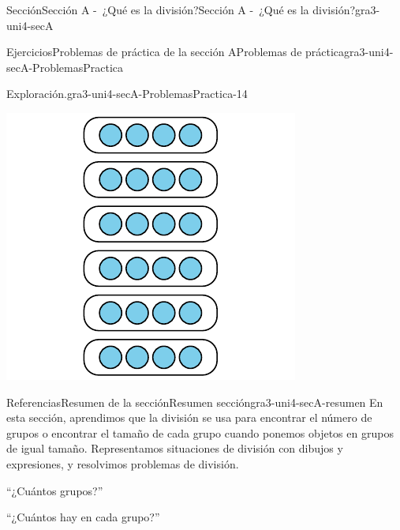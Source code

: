 \documentclass[twoside,10pt,]{article}
\begin{document}
\begin{sectionptx}{Sección}{Sección A -~¿Qué es la división?}{}{Sección A -~¿Qué es la división?}{}{}{gra3-uni4-secA}
\begin{exercises-subsection}{Ejercicios}{Problemas de práctica de la sección A}{}{Problemas de práctica}{}{}{gra3-uni4-secA-ProblemasPractica}
\begin{divisionexercise}{12}{Exploración.}{}{gra3-uni4-secA-ProblemasPractica-14}
\begin{sidebyside}{3}{0}{0}{0.02}
\begin{sbspanel}{0.32}
\includegraphics[width=\linewidth]{external/svg-source/tikz-file-151676.pdf}
\end{sbspanel}%
\end{sidebyside}%
\end{divisionexercise}%
\end{exercises-subsection}
%
%
\typeout{************************************************}
\typeout{************************************************}
%
\begin{references-subsection}{Referencias}{Resumen de la sección}{}{Resumen sección}{}{}{gra3-uni4-secA-resumen}
En esta sección, aprendimos que la división se usa para encontrar el número de grupos o encontrar el tamaño de cada grupo cuando ponemos objetos en grupos de igual tamaño. Representamos situaciones de división con dibujos y expresiones, y resolvimos problemas de división.%
\begin{sidebyside}{2}{0.025}{0.025}{0.05}%
\begin{sbspanel}{0.45}%
``¿Cuántos grupos?''%
\end{sbspanel}%
\begin{sbspanel}{0.45}%
\par
``¿Cuántos hay en cada grupo?''%
\end{sbspanel}%
\end{sidebyside}%
\begin{sidebyside}{2}{0.025}{0.025}{0.05}%

\end{sidebyside}
\end{references-subsection}
\end{sectionptx}
\end{document}

